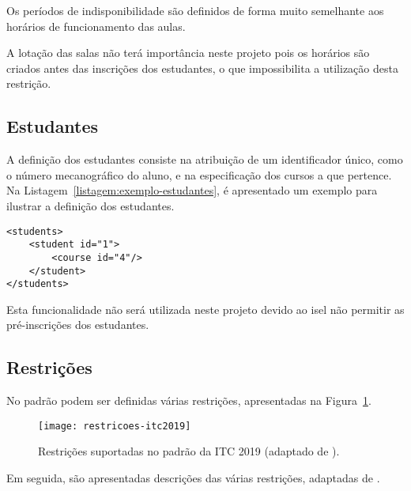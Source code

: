 Os períodos de indisponibilidade são definidos de forma muito semelhante aos horários de funcionamento das aulas.

A lotação das salas não terá importância neste projeto pois os horários são criados antes das inscrições dos estudantes, o que impossibilita a utilização desta restrição.



\subsection{Estudantes}

A definição dos estudantes consiste na atribuição de um identificador único, como o número mecanográfico do aluno, e na especificação dos cursos a que pertence. Na Listagem~\ref{listagem:exemplo-estudantes}, é apresentado um exemplo para ilustrar a definição dos estudantes.

\begin{minipage}[c]{\linewidth}
\begin{lstlisting}[caption={Exemplo da definição dos estudantes.}, label={listagem:exemplo-estudantes}]
<students>
    <student id="1">
        <course id="4"/>
    </student>
</students>
\end{lstlisting}
\end{minipage}

Esta funcionalidade não será utilizada neste projeto devido ao \gls{isel} não permitir as pré-inscrições dos estudantes.

\subsection{Restrições}

No padrão podem ser definidas várias restrições, apresentadas na Figura~\ref{fig:restricoes-itc2019}.

\begin{figure}[ht]
    \centering
    \texttt{[image: restricoes-itc2019]}
    \caption{Restrições suportadas no padrão da ITC 2019 (adaptado de \cite{itc2019-Website}).}
    \label{fig:restricoes-itc2019}
\end{figure}

Em seguida, são apresentadas descrições das várias restrições, adaptadas de \cite{itc2019-Website}.

